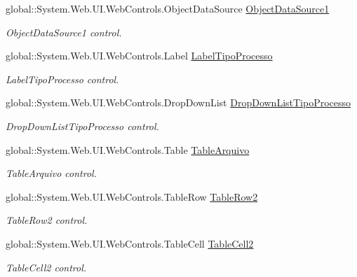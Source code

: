 \begin{DoxyCompactItemize}
global::System.Web.UI.WebControls.ObjectDataSource \hyperlink{class_sistema_r_h_1_1tab__default_a0cd653428e8c98d939aff2d11ff144dd}{ObjectDataSource1}
\begin{DoxyCompactList}\small\item\em ObjectDataSource1 control. \item\end{DoxyCompactList}\item 
global::System.Web.UI.WebControls.Label \hyperlink{class_sistema_r_h_1_1tab__default_a7f6a793b6c42067e9b0ca36c49ee889f}{LabelTipoProcesso}
\begin{DoxyCompactList}\small\item\em LabelTipoProcesso control. \item\end{DoxyCompactList}\item 
global::System.Web.UI.WebControls.DropDownList \hyperlink{class_sistema_r_h_1_1tab__default_ac3fee4391b73e5c9eb11b9e4a711a61d}{DropDownListTipoProcesso}
\begin{DoxyCompactList}\small\item\em DropDownListTipoProcesso control. \item\end{DoxyCompactList}\item 
global::System.Web.UI.WebControls.Table \hyperlink{class_sistema_r_h_1_1tab__default_a644d387b1dacfff7e019013eb3f9e5fb}{TableArquivo}
\begin{DoxyCompactList}\small\item\em TableArquivo control. \item\end{DoxyCompactList}\item 
global::System.Web.UI.WebControls.TableRow \hyperlink{class_sistema_r_h_1_1tab__default_a0817cbd25c8af6f28f40a2bf0d430c54}{TableRow2}
\begin{DoxyCompactList}\small\item\em TableRow2 control. \item\end{DoxyCompactList}\item 
global::System.Web.UI.WebControls.TableCell \hyperlink{class_sistema_r_h_1_1tab__default_afdae065ed4fd2471b86d637916b9180c}{TableCell2}
\begin{DoxyCompactList}\small\item\em TableCell2 control. \item\end{DoxyCompactList}\item 

\end{DoxyCompactItemize}
